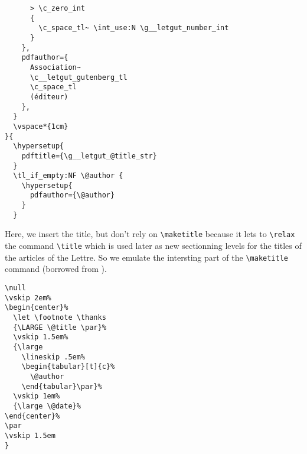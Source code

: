 \documentclass{letgut}
\begin{document}
\begin{lstlisting}
      > \c_zero_int
      {
        \c_space_tl~ \int_use:N \g__letgut_number_int
      }
    },
    pdfauthor={
      Association~
      \c__letgut_gutenberg_tl
      \c_space_tl
      (éditeur)
    },
  }
  \vspace*{1cm}
}{
  \hypersetup{
    pdftitle={\g__letgut_@title_str}
  }
  \tl_if_empty:NF \@author {
    \hypersetup{
      pdfauthor={\@author}
    }
  }
\end{lstlisting}
Here, we insert the title, but don't rely on \lstinline+\maketitle+ because it
lets to \lstinline+\relax+ the command \lstinline+\title+ which is used later as new sectionning
levels for the titles of the articles of the Lettre. So we emulate the
intersting part of the \lstinline+\maketitle+ command (borrowed from ).
\begin{lstlisting}
\null
\vskip 2em%
\begin{center}%
  \let \footnote \thanks
  {\LARGE \@title \par}%
  \vskip 1.5em%
  {\large
    \lineskip .5em%
    \begin{tabular}[t]{c}%
      \@author
    \end{tabular}\par}%
  \vskip 1em%
  {\large \@date}%
\end{center}%
\par
\vskip 1.5em
}
\end{lstlisting}
\end{document}
